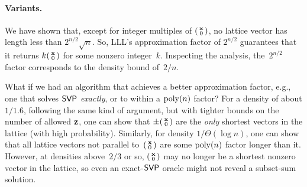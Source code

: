 \documentclass[11pt]{article}
\begin{document}
\paragraph{Variants.}

We have shown that, except for integer multiples of
$\left(\begin{smallmatrix}\mathbf{x} \\ 0\end{smallmatrix}\right)$, no lattice vector has length less than
$2^{n/2} \sqrt{n}$. So, LLL's approximation factor of $2^{n/2}$
guarantees that it returns $k \smlmat{\vecx \\ 0}$ for some nonzero
integer~$k$. Inspecting the analysis, the~$2^{n/2}$ factor corresponds
to the density bound of~$2/n$.

What if we had an algorithm that achieves a better approximation
factor, e.g., one that solves $\mathsf{SVP}$ \emph{exactly}, or to within a
$\operatorname{poly}(n)$ factor? For a density of about $1/1.6$, following the same
kind of argument, but with tighter bounds on the number of allowed
$\mathbf{z}$, one can show that $\pm \smlmat{\vecx \\ 0}$ are the
\emph{only} shortest vectors in the lattice (with high probability).
Similarly, for density $1/\Theta(\log n)$, one can show that all
lattice vectors not parallel to~$\left(\begin{smallmatrix}\mathbf{x} \\ 0\end{smallmatrix}\right)$ are some
$\operatorname{poly}(n)$ factor longer than it. However, at densities above~$2/3$ or
so, $\left(\begin{smallmatrix}\mathbf{x} \\ 0\end{smallmatrix}\right)$ may no longer be a shortest nonzero vector
in the lattice, so even an exact-$\mathsf{SVP}$ oracle might not reveal a
subset-sum solution.
    


\end{document}

